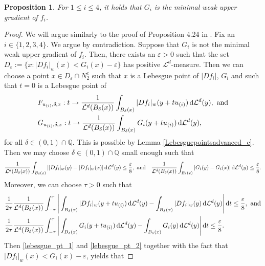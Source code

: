 \documentclass[a4paper,10pt]{article}
\newtheorem{proposition}[theorem]{Proposition}
\numberwithin{equation}{section}
\newcommand{\Q}{\mathbb{Q}}
\newcommand{\e}{\varepsilon}
\newcommand{\di}{{\rm d}}
\begin{document}
\begin{proposition}\label{minimal_weak_upper_gradient_ex1}
    For $1 \leq i \leq 4$, it holds that $G_i$ is the minimal weak upper gradient of $f_i$.
\end{proposition}
\begin{proof}
We will argue similarly to the proof of Proposition 4.24 in \cite{mondino2025equivalence}. 
    Fix an $i \in \{1,2,3,4\}$. We argue by contradiction. Suppose that $G_i$ is not the minimal weak upper gradient of $f_i$. Then, there exists an $\e >0$ such that the set $D_\e:= \{x: |Df_i|_w(x) < G_i(x)-\e\}$ has positive $\mathcal{L}^d$-measure. Then we can choose a point $x \in D_\e \cap N_2^c$ such that $x$ is a Lebesgue point of $|Df_i|$, $G_i$ and such that $t=0$ is a Lebesgue point of 
    \begin{align*}
         &F_{u_{(i)}, \delta, x}: t \to \frac{1}{\mathcal{L}^d(B_\delta(x))}\int_{B_\delta(x)} |Df_i|_w(y + tu_{(i)})\,\di\mathcal{L}^d(y), \ \mathrm{and} \\
         &G_{u_{(i)}, \delta, x}: t \to \frac{1}{\mathcal{L}^d(B_\delta(x))}\int_{B_\delta(x)} G_i(y + tu_{(i)})\,\di\mathcal{L}^d(y),
    \end{align*} 
    for all $\delta \in (0,1) \cap \Q$. This is possible by Lemma \ref{Lebesguepointsadvanced_c}. Then we may choose $\delta \in (0,1) \cap \Q$ small enough such that 
    \begin{align}\label{lebesgue_pt_1}
        &\frac{1}{\mathcal{L}^d(B_\delta(x))}\int_{B_\delta(x)} ||Df_i|_w(y) - |Df_i|_w(x)|\,\di\mathcal{L}^d(y) \leq \frac{\e}{8}, \ \mathrm{and}
        &\frac{1}{\mathcal{L}^d(B_\delta(x))}\int_{B_\delta(x)} |G_i(y)-G_i(x)|\,\di\mathcal{L}^d(y)  \leq \frac{\e}{8}.
    \end{align}
    Moreover, we can choose $\tau>0$ such that 
    \begin{align}\label{lebesgue_pt_2}
       & \frac{1}{2\tau} \frac{1}{\mathcal{L}^d(B_\delta(x))} \int_{-\tau}^\tau \Bigg|\int_{B_\delta(x)} |Df_i|_w(y+tu_{(i)})\,\di\mathcal{L}^d(y) - \int_{B_\delta(x)}|Df_i|_w(y) \,\di\mathcal{L}^d(y)\Bigg|\, \di t \leq \frac{\e}{8}, \ \mathrm{and} \nonumber \\
        &\frac{1}{2\tau} \frac{1}{\mathcal{L}^d(B_\delta(x))} \int_{-\tau}^\tau \Bigg|\int_{B_\delta(x)} G_i(y+tu_{(i)})\,\di\mathcal{L}^d(y) - \int_{B_\delta(x)}G_i(y) \,\di\mathcal{L}^d(y)\Bigg|\, \di t \leq \frac{\e}{8}.
    \end{align}
    Then \eqref{lebesgue_pt_1} and \eqref{lebesgue_pt_2} together with the fact that $|Df_i|_w(x) < G_i(x)-\e$, yields that

\end{proof}
\end{document}
